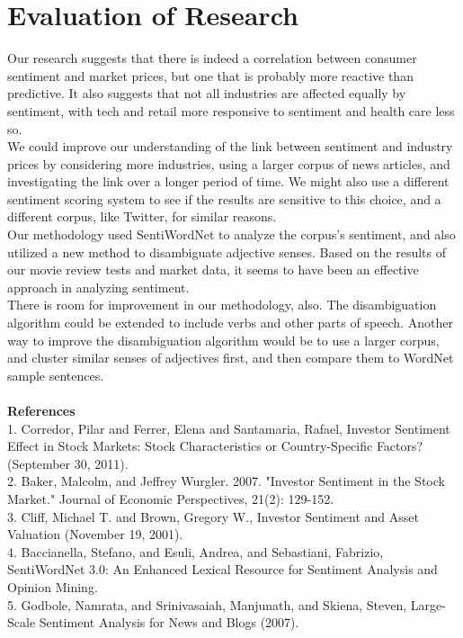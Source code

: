 \documentclass[pageno]{jpaper}
\begin{document}
\section{Evaluation of Research}
Our research suggests that there is indeed a correlation between consumer sentiment and market prices, but one that is probably more reactive than predictive. It also suggests that not all industries are affected equally by sentiment, with tech and retail more responsive to sentiment and health care less so. \\
\indent We could improve our understanding of the link between sentiment and industry prices by considering more industries, using a larger corpus of news articles, and investigating the link over a longer period of time. We might also use a different sentiment scoring system to see if the results are sensitive to this choice, and a different corpus, like Twitter, for similar reasons. \\
\indent Our methodology used SentiWordNet to analyze the corpus's sentiment, and also utilized a new method to disambiguate adjective senses. Based on the results of our movie review tests and market data, it seems to have been an effective approach in analyzing sentiment. \\
\indent There is room for improvement in our methodology, also. The disambiguation algorithm could be extended to include verbs and other parts of speech. Another way to improve the disambiguation algorithm would be to use a larger corpus, and cluster similar senses of adjectives first, and then compare them to WordNet sample sentences.\\
\\
{\bf References} \\
1. Corredor, Pilar and Ferrer, Elena and Santamaria, Rafael, Investor Sentiment Effect in 
Stock Markets: Stock Characteristics or Country-Specific Factors? (September 30, 2011). \\
2. Baker, Malcolm, and Jeffrey Wurgler. 2007. "Investor Sentiment in the Stock Market." 
Journal of Economic Perspectives, 21(2): 129-152. \\
3. Cliff, Michael T. and Brown, Gregory W., Investor Sentiment and Asset Valuation (November 19, 2001). \\
4. Baccianella, Stefano, and Esuli, Andrea, and Sebastiani, Fabrizio, SentiWordNet 3.0: An Enhanced Lexical Resource
for Sentiment Analysis and Opinion Mining. \\
5. Godbole, Namrata, and Srinivasaiah, Manjunath, and Skiena, Steven, Large-Scale Sentiment Analysis for News and Blogs (2007).\\
\end{document}
